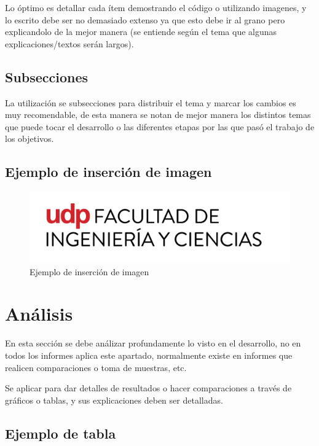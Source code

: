 \documentclass[letter,12pt]{article}
\begin{document}
Lo óptimo es detallar cada ítem demostrando el código o utilizando imagenes, y lo escrito debe ser no demasiado extenso ya que esto debe ir al grano pero explicandolo de la mejor manera (se entiende según el tema que algunas explicaciones/textos serán largos).

\subsection{Subsecciones}

La utilización se subsecciones para distribuir el tema y marcar los cambios es muy recomendable, de esta manera se notan de mejor manera los distintos temas que puede tocar el desarrollo o las diferentes etapas por las que pasó el trabajo de los objetivos.

\subsection{Ejemplo de inserción de imagen}

\begin{figure}[H]
    \centering
    \includegraphics[width=1\textwidth]{Images/Universidad Logo.png}
    \caption{Ejemplo de inserción de imagen}
\end{figure}

\newpage

\section{Análisis}

En esta sección se debe análizar profundamente lo visto en el desarrollo, no en todos los informes aplica este apartado, normalmente existe en informes que realicen comparaciones o toma de muestras, etc.

Se aplicar para dar detalles de resultados o hacer comparaciones a través de gráficos o tablas, y sus explicaciones deben ser detalladas.

\subsection{Ejemplo de tabla}
\end{document}
